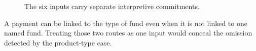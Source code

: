 \begin{figure}[H]
\centering
{}
\caption{The six inputs carry separate interpretive commitments.}\label{fig:teach-M02-02}
\end{figure}

A payment can be linked to the type of fund even when it is not linked to one named fund. Treating those two routes as one input would conceal the omission detected by the product-type case.

